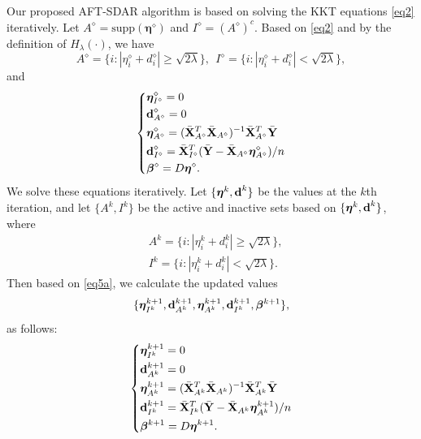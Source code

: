 \documentclass[12pt]{article}
\newcommand{\bX}{{\bf X}}
\newcommand{\bd}{\mbox{\bf d}}
\newcommand{\bY}{\mbox{\bf Y}}
\newcommand{\bbeta}{\boldsymbol{\beta}}
\newcommand{\boldeta}{\boldsymbol{\eta}}
\begin{document}


Our proposed AFT-SDAR algorithm is based on solving the KKT equations
\eqref{eq2} iteratively.
Let $A^\diamond=\text{supp}(\boldeta^\diamond)$ and $I^\diamond=(A^\diamond)^c$.
Based on \eqref{eq2} and by the definition of $H_{\lambda}(\cdot)$, we have
\begin{equation*}
A^\diamond=\{i:|\eta^\diamond_{i}+ d^\diamond_{i}|\geq\sqrt{2\lambda}\},~~I^\diamond=\{i:|\eta^\diamond_{i}+ d^\diamond_{i}|<\sqrt{2\lambda}\},
\end{equation*}
and
\begin{align}
\label{eq5a}
\left\{
\begin{aligned}
&\boldeta_{I^\diamond}^{\diamond} =0\\
&\bd_{A^\diamond}^{\diamond} =0\\
&\boldeta_{A^\diamond}^{\diamond}=(\bar{\bX}_{A^\diamond}^{T}\bar{\bX}_{A^\diamond})^{-1}\bar{\bX}_{A^\diamond}^{T}\bar{\bY}\\
&\bd_{I^\diamond}^{\diamond}=\bar{\bX}_{I^\diamond}^{T}(\bar{\bY}-\bar{\bX}_{A^\diamond}\boldeta_{A^\diamond}^{\diamond})/n\\
&\bbeta^{\diamond}=D\boldeta^{\diamond}.
\end{aligned}
\right.
\end{align}
We solve these equations iteratively.
Let $\{\boldeta^{k},\bd^{k}\}$ be the values at the $k$th iteration,
and let $\{A^{k},I^{k}\}$ be the active and inactive sets based on
$\{\boldeta^{k},\bd^{k}\}$, where
\begin{equation}\label{eq4}
\begin{split}
&A^k=\{i:|\eta^k_{i}+ d^k_{i}|\geq\sqrt{2\lambda}\},\\
&I^k=\{i:|\eta^k_{i}+ d^k_{i}|<\sqrt{2\lambda}\}.
\end{split}
\end{equation}
Then based on \eqref{eq5a}, we calculate the updated values
\begin{equation*}
\{\boldeta^{k+1}_{I^{k}},\bd^{k+1}_{A^{k}},\boldeta^{k+1}_{A^{k}},\bd^{k+1}_{I^{k}},\bbeta^{k+1}\},
\end{equation*}
as follows:
\begin{align}\label{eq5}
\left\{
\begin{aligned}
&\boldeta^{k+1}_{I^{k}}=0\\
&\bd^{k+1}_{A^{k}} =0\\
&\boldeta^{k+1}_{A^{k}}=(\bar{\bX}_{A^k}^{T}\bar{\bX}_{A^k})^{-1}\bar{\bX}_{A^k}^{T}\bar{\bY}\\
&\bd^{k+1}_{I^{k}}=\bar{\bX}_{I^k}^{T}(\bar{\bY}-\bar{\bX}_{A^k}\boldeta_{A^k}^{k+1})/n\\
&\bbeta^{k+1}=D\boldeta^{k+1}.\\
\end{aligned}
\right.
\end{align}
\end{document}
